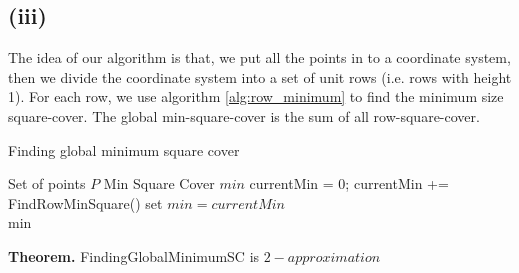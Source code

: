 \subsection*{(iii)}
\label{a-1-3-3}

The idea of our algorithm is that, we put all the points in to a coordinate system, then we divide the coordinate system into a set of unit rows (i.e. rows with height 1). For each row, we use algorithm \ref{alg:row_minimum} to find the minimum size square-cover. The global min-square-cover is the sum of all row-square-cover.

\begin{algorithm}
  \caption{Finding global minimum square cover}
  \label{alg:global_minimum}
  \begin{algorithmic}
    \renewcommand{\algorithmicrequire}{\textbf{Input:}}
    \renewcommand{\algorithmicensure}{\textbf{Output:}}
    \algnewcommand{}
    \algnewcommand\Operation{\item[\algorithmicoperation]}
    \Require Set of points $P$
    \Ensure Min Square Cover $min$
    \Operation
    \State currentMin = 0;
    \State currentMin += FindRowMinSquare()
    \EndFor
    \State set $min = currentMin$ \\
    \Return min
  \end{algorithmic}
\end{algorithm}

\textbf{Theorem.} FindingGlobalMinimumSC is $2-approximation$

